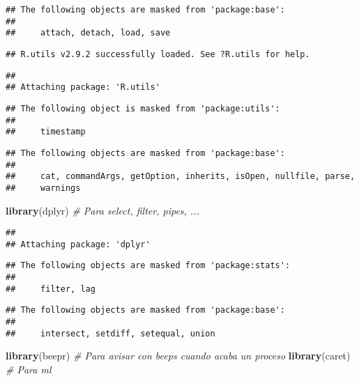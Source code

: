 \documentclass[
]{article}
\newenvironment{Shaded}{\begin{snugshade}}{\end{snugshade}}
\newcommand{\CommentTok}[1]{\textcolor[rgb]{0.56,0.35,0.01}{\textit{#1}}}
\newcommand{\KeywordTok}[1]{\textcolor[rgb]{0.13,0.29,0.53}{\textbf{#1}}}
\newcommand{\NormalTok}[1]{#1}
\begin{document}
\begin{verbatim}
## The following objects are masked from 'package:base':
## 
##     attach, detach, load, save
\end{verbatim}

\begin{verbatim}
## R.utils v2.9.2 successfully loaded. See ?R.utils for help.
\end{verbatim}

\begin{verbatim}
## 
## Attaching package: 'R.utils'
\end{verbatim}

\begin{verbatim}
## The following object is masked from 'package:utils':
## 
##     timestamp
\end{verbatim}

\begin{verbatim}
## The following objects are masked from 'package:base':
## 
##     cat, commandArgs, getOption, inherits, isOpen, nullfile, parse,
##     warnings
\end{verbatim}

\begin{Shaded}
\begin{Highlighting}[]
\KeywordTok{library}\NormalTok{(dplyr)       }\CommentTok{# Para select, filter, pipes, ...}
\end{Highlighting}
\end{Shaded}

\begin{verbatim}
## 
## Attaching package: 'dplyr'
\end{verbatim}

\begin{verbatim}
## The following objects are masked from 'package:stats':
## 
##     filter, lag
\end{verbatim}

\begin{verbatim}
## The following objects are masked from 'package:base':
## 
##     intersect, setdiff, setequal, union
\end{verbatim}

\begin{Shaded}
\begin{Highlighting}[]
\KeywordTok{library}\NormalTok{(beepr)       }\CommentTok{# Para avisar con beeps cuando acaba un proceso}
\KeywordTok{library}\NormalTok{(caret)       }\CommentTok{# Para ml}
\end{Highlighting}
\end{Shaded}
\end{document}

